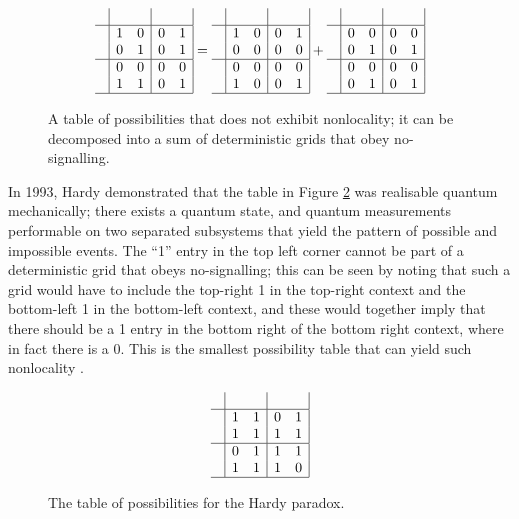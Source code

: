 \documentclass[reprint]{revtex4-1}
\theoremstyle{definition}
\begin{document}
\begin{figure}
\begin{equation*}
\begin{array}{c| c c | c c |}
&&&&\\ \hline
&1 &0  &0 & 1\\
&0&1  &0 &1\\ \hline
&0&0&0&0 \\
&1&1 &0 &1 \\ \hline
\end{array} =
\begin{array}{c| c c | c c |}
&&&&\\ \hline
&1 &0  &0 & 1\\
&0&0  &0 &0\\ \hline
&0&0&0&0 \\
&1&0 &0 &1 \\ \hline
\end{array} +
\begin{array}{c| c c | c c |}
&&&&\\ \hline
&0 &0  &0 & 0\\
&0&1  &0 &1\\ \hline
&0&0&0&0 \\
&0&1 &0 &1 \\ \hline
\end{array} 
\end{equation*}
\caption{A table of possibilities that does not exhibit nonlocality; it can be decomposed into a sum of deterministic grids that obey no-signalling.}
\label{localtable}
\end{figure}

In 1993, Hardy \cite{Hard1993} demonstrated that the table in Figure \ref{HardyParadox} was realisable quantum mechanically; there exists a quantum state, and quantum measurements performable on two separated subsystems that yield the pattern of possible and impossible events. The ``1'' entry in the top left corner cannot be part of a deterministic grid that obeys no-signalling; this can be seen by noting that such a grid would have to include the top-right 1 in the top-right context and the bottom-left 1 in the bottom-left context, and these would together imply that there should be a 1 entry in the bottom right of the bottom right context, where in fact there is a 0. This is the smallest possibility table that can yield such nonlocality \cite{Mans2011}.


\begin{figure}
\begin{equation*}
\begin{array}{c| c c | c c |}
&&&&\\ \hline
&1 &1  &0 & 1\\
&1&1  &1&1\\ \hline
&0&1&1&1 \\
&1&1 &1 &0 \\ \hline
\end{array}
\end{equation*}
\caption{The table of possibilities for the Hardy paradox.}
\label{HardyParadox}
\end{figure}
\end{document}
